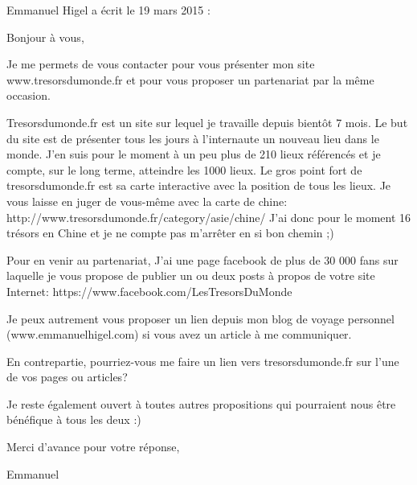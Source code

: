 \medskip
Emmanuel Higel a écrit le 19 mars 2015 :
\begin{displayquote}
Bonjour à vous,

Je me permets de vous contacter pour vous présenter mon site www.tresorsdumonde.fr et pour vous proposer un partenariat par la même occasion.

Tresorsdumonde.fr est un site sur lequel je travaille depuis bientôt 7 mois. Le but du site est de présenter tous les jours à l'internaute un nouveau lieu dans le monde.
J'en suis pour le moment à un peu plus de 210 lieux référencés et je compte, sur le long terme, atteindre les 1000 lieux.
Le gros point fort de tresorsdumonde.fr est sa carte interactive avec la position de tous les lieux. Je vous laisse en juger de vous-même avec la carte de chine:
http://www.tresorsdumonde.fr/category/asie/chine/
J'ai donc pour le moment 16 trésors en Chine et je ne compte pas m'arrêter en si bon chemin ;)

Pour en venir au partenariat, J'ai une page facebook de plus de 30 000 fans sur laquelle je vous propose de publier un ou deux posts à propos de votre site Internet:
https://www.facebook.com/LesTresorsDuMonde

Je peux autrement vous proposer un lien depuis mon blog de voyage personnel (www.emmanuelhigel.com) si vous avez un article à me communiquer.

En contrepartie, pourriez-vous me faire un lien vers tresorsdumonde.fr sur l'une de vos pages ou articles?

Je reste également ouvert à toutes autres propositions qui pourraient nous être bénéfique à tous les deux :)

Merci d'avance pour votre réponse,

Emmanuel
\end{displayquote}

